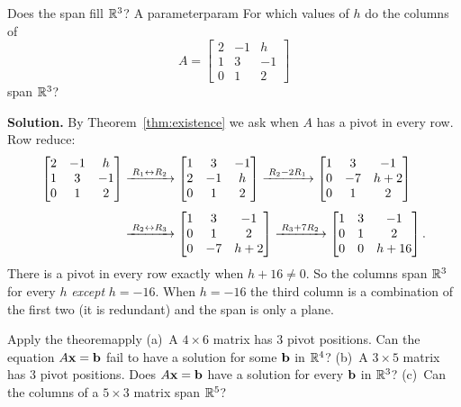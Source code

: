 \documentclass[11pt]{article}
\begin{document}
\begin{exmp}{Does the span fill $\mathbb{R}^3$? A parameter}{param}
For which values of $h$ do the columns of
\[
A=\begin{bmatrix}2&-1&h\\1&3&-1\\0&1&2\end{bmatrix}
\]
span $\mathbb{R}^3$?
 
\textbf{Solution.} By Theorem~\ref{thm:existence} we ask when $A$ has a pivot in every row. Row reduce:
\begin{align*}
\begin{bmatrix}2&-1&h\\1&3&-1\\0&1&2\end{bmatrix}
&\xrightarrow{\;R_1\leftrightarrow R_2\;}
\begin{bmatrix}1&3&-1\\2&-1&h\\0&1&2\end{bmatrix}
\xrightarrow{\;R_2-2R_1\;}
\begin{bmatrix}1&3&-1\\0&-7&h+2\\0&1&2\end{bmatrix}\\[4pt]
&\xrightarrow{\;R_2\leftrightarrow R_3\;}
\begin{bmatrix}1&3&-1\\0&1&2\\0&-7&h+2\end{bmatrix}
\xrightarrow{\;R_3+7R_2\;}
\begin{bmatrix}1&3&-1\\0&1&2\\0&0&h+16\end{bmatrix}.
\end{align*}
There is a pivot in every row exactly when $h+16\neq0$. So the columns span $\mathbb{R}^3$ for every $h$ \emph{except} $h=-16$. When $h=-16$ the
third column is a combination of the first two (it is redundant) and the span is only a plane.
\end{exmp}
 
\begin{kc}{Apply the theorem}{apply}
(a)~A $4\times6$ matrix has $3$ pivot positions. Can the equation $A\mathbf{x}=\mathbf{b}$ fail to have a solution for some $\mathbf{b}$ in $\mathbb{R}^4$?
(b)~A $3\times5$ matrix has $3$ pivot positions. Does $A\mathbf{x}=\mathbf{b}$ have a solution for every $\mathbf{b}$ in $\mathbb{R}^3$?
(c)~Can the columns of a $5\times3$ matrix span $\mathbb{R}^5$?
\end{kc}
 
\end{document}
